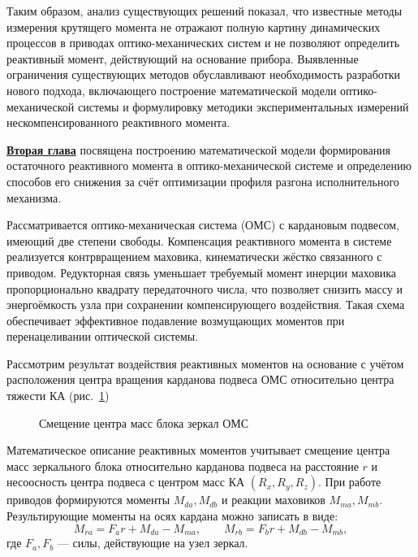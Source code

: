 Таким образом, анализ существующих решений показал, что известные методы измерения крутящего момента не отражают полную картину динамических процессов в приводах оптико-механических систем и не позволяют определить реактивный момент, действующий на основание прибора.
Выявленные ограничения существующих методов обуславливают необходимость разработки нового подхода, включающего построение математической модели оптико-механической системы и формулировку методики экспериментальных измерений нескомпенсированного реактивного момента.


\underline{\textbf{Вторая глава}} посвящена построению математической модели формирования остаточного реактивного момента в оптико-механической системе и определению способов его снижения за счёт оптимизации профиля разгона исполнительного механизма.

Рассматривается оптико-механическая система (ОМС) с кардановым подвесом, имеющий две степени свободы. Компенсация реактивного момента в системе реализуется контрвращением маховика, кинематически жёстко связанного с приводом. Редукторная связь уменьшает требуемый момент инерции маховика пропорционально квадрату передаточного числа, что позволяет снизить массу и энергоёмкость узла при сохранении компенсирующего воздействия. Такая схема обеспечивает эффективное подавление возмущающих моментов при перенацеливании оптической системы.

Рассмотрим результат воздействия реактивных моментов на основание с учётом расположения центра вращения карданова подвеса ОМС относительно центра тяжести КА (рис.~\cref{fig:tikz_YPK})
\begin{figure}[h!]
	\legend{}
	\caption[Пример \texttt{tikz} схемы]{Смещение центра масс блока зеркал ОМС}\label{fig:tikz_YPK}
\end{figure}

Математическое описание реактивных моментов учитывает смещение центра масс зеркального блока относительно карданова подвеса на расстояние $r$ и несоосность центра подвеса с центром масс КА $(R_x,R_y,R_z)$. При работе приводов формируются моменты $M_{da}, M_{db}$ и реакции маховиков $M_{ma}, M_{mb}$. Результирующие моменты на осях кардана можно записать в виде:
\begin{equation*}
	M_{ra} = F_a r + M_{da} - M_{ma}, 
	\qquad 
	M_{rb} = F_b r + M_{db} - M_{mb},
\end{equation*}
где $F_a, F_b$ --- силы, действующие на узел зеркал. 

